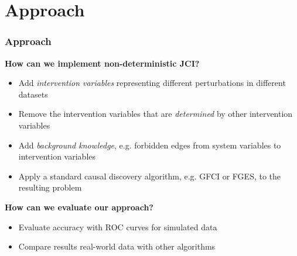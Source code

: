 \documentclass[10pt, compress]{beamer}
\begin{document}
\section{Approach}
\begin{frame}
    \frametitle{Approach}
    \textbf{How can we implement non-deterministic JCI?}
    \medskip
    
    \begin{itemize}
        \item Add \emph{intervention variables} representing different perturbations in different datasets 
        \item Remove the intervention variables that are \emph{determined} by other intervention variables
        \item Add \emph{background knowledge}, e.g. forbidden edges from system variables to intervention variables
        \item Apply a standard causal discovery algorithm, e.g. GFCI or FGES, to the resulting problem
    \end{itemize}
    
      \bigskip
       \textbf{How can we evaluate our approach?}
  \medskip
  
    \begin{itemize}
        \item Evaluate accuracy with ROC curves for simulated data
        \item Compare results real-world data with other algorithms
    \end{itemize}
\end{frame}
\end{document}
